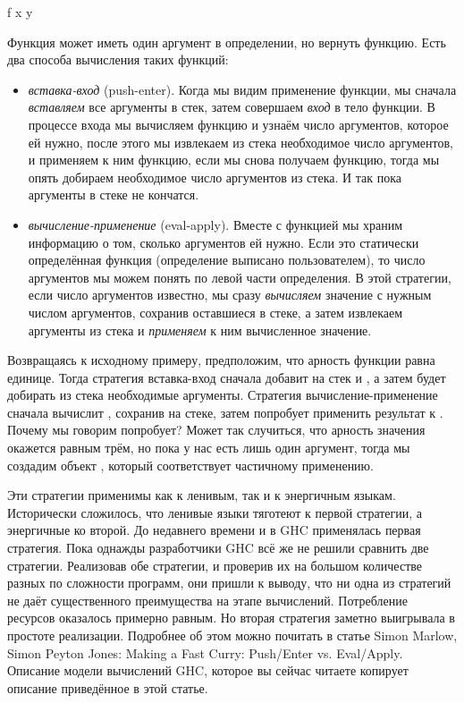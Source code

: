 \begin{code}
f x y
\end{code}

Функция  может иметь один аргумент в определении, 
но вернуть функцию. Есть два способа вычисления таких функций:

\begin{itemize}
\item \emph{вставка-вход} (push-enter). Когда мы видим 
применение функции, мы сначала \emph{вставляем} все аргументы в стек,
затем совершаем \emph{вход} в тело функции. В процессе входа
мы вычисляем функцию  и узнаём число аргументов, которое
ей нужно, после этого мы извлекаем из стека необходимое число 
аргументов, и применяем к ним функцию, если мы снова получаем функцию,
тогда мы опять добираем необходимое число аргументов из стека.
И так пока аргументы в стеке не кончатся.

\item \emph{вычисление-применение} (eval-apply). Вместе с функцией
мы храним информацию о том, сколько аргументов ей нужно. 
Если это статически определённая функция 
(определение выписано пользователем), то число аргументов мы можем
понять по левой части определения. В этой стратегии, если число
аргументов известно, мы сразу \emph{вычисляем} значение с
нужным числом аргументов, сохранив оставшиеся в стеке, 
а затем извлекаем аргументы из стека и \emph{применяем}
к ним вычисленное значение.
\end{itemize}

Возвращаясь к исходному примеру, предположим, что арность
функции  равна единице. Тогда стратегия вставка-вход
сначала добавит на стек  и , а затем будет добирать
из стека необходимые аргументы. Стратегия вычисление-применение
сначала вычислит , сохранив  на стеке, затем
попробует применить результат к . Почему мы говорим
попробует? Может так случиться, что арность значения 
окажется равным трём, но пока у нас есть лишь один аргумент,
тогда мы создадим объект , который соответствует 
частичному применению. 

Эти стратегии применимы как к ленивым, так и к энергичным языкам. 
Исторически сложилось, что ленивые языки тяготеют к первой 
стратегии, а энергичные ко второй. До недавнего времени
и в GHC применялась первая стратегия. Пока однажды разработчики GHC 
всё же не решили сравнить две стратегии. Реализовав обе стратегии,
и проверив их на большом количестве разных по сложности программ,
они пришли к выводу, что ни одна из стратегий не даёт существенного
преимущества на этапе вычислений. Потребление ресурсов оказалось 
примерно равным. Но вторая стратегия заметно выигрывала
в простоте реализации. Подробнее об этом можно почитать в статье
Simon Marlow, Simon Peyton Jones:
Making a Fast Curry: Push/Enter vs. Eval/Apply.
Описание модели вычислений GHC, которое вы сейчас читаете
копирует описание приведённое в этой статье. 

